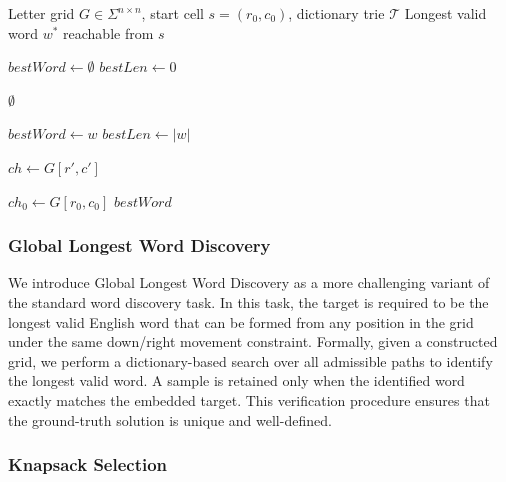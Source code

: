 \documentclass{llmxive}
\begin{document}
\begin{algorithm}[t]
\caption{Trie-based verification from a fixed start cell}
\label{alg:verify_longest_word}
\begin{algorithmic}[1]
\Require Letter grid $G \in \Sigma^{n \times n}$, start cell $s=(r_0,c_0)$, dictionary trie $\mathcal{T}$
\Ensure Longest valid word $w^*$ reachable from $s$

\State $\textit{bestWord} \gets \emptyset$
\State $\textit{bestLen} \gets 0$

    \State \Return $\emptyset$
\EndIf

        \State $\textit{bestWord} \gets w$
        \State $\textit{bestLen} \gets |w|$
    \EndIf

            \State $ch \gets G[r',c']$
                \State {}
            \EndIf
        \EndIf
    \EndFor
\EndFunction

\State $ch_0 \gets G[r_0,c_0]$
\State {}
\State \Return $\textit{bestWord}$
\end{algorithmic}
\end{algorithm}

\subsubsection{Global Longest Word Discovery}

We introduce Global Longest Word Discovery as a more challenging variant of the standard word discovery task. In this task, the target is required to be the longest valid English word that can be formed from any position in the grid under the same down/right movement constraint. Formally, given a constructed grid, we perform a dictionary-based search over all admissible paths to identify the longest valid word. A sample is retained only when the identified word exactly matches the embedded target. This verification procedure ensures that the ground-truth solution is unique and well-defined.

\subsubsection{Knapsack Selection}
\end{document}
